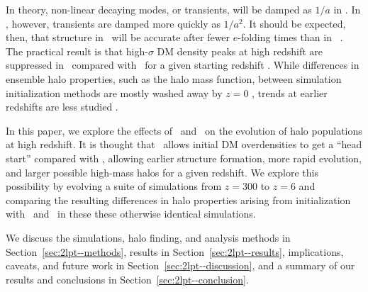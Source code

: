 

In theory, non-linear decaying modes, or transients, will be damped as $1 / a$ in \za.  In \lpt, however, transients are damped more quickly as $1 / a^{2}$.  It should be expected, then, that structure in \lpt\ will be accurate after fewer $e$-folding times than in \za\ \citep{1998MNRAS.299.1097S, 2006MNRAS.373..369C, 2010MNRAS.403.1859J}.  The practical result is that high-$\sigma$ DM density peaks at high redshift are suppressed in \za\ compared with \lpt\ for a given starting redshift \citep{2006MNRAS.373..369C}.  While differences in ensemble halo properties, such as the halo mass function, between simulation initialization methods are mostly washed away by $z=0$ \citep{1998MNRAS.299.1097S}, trends at earlier redshifts are less studied \citep{2007ApJ...671.1160L}.






In this paper, we explore the effects of \za\ and \lpt\ on the evolution of halo populations at high redshift.  It is thought that \lpt\ allows initial DM overdensities to get a ``head start'' compared with \za, allowing earlier structure formation, more rapid evolution, and larger possible high-mass halos for a given redshift.  We explore this possibility by evolving a suite of simulations from $z = 300$ to $z = 6$ and comparing the resulting differences in halo properties arising from initialization with \za\ and \lpt\ in these these otherwise identical simulations.

We discuss the simulations, halo finding, and analysis methods in Section~\ref{sec:2lpt--methods}, results in Section~\ref{sec:2lpt--results}, implications, caveats, and future work in Section~\ref{sec:2lpt--discussion}, and a summary of our results and conclusions in Section~\ref{sec:2lpt--conclusion}.




